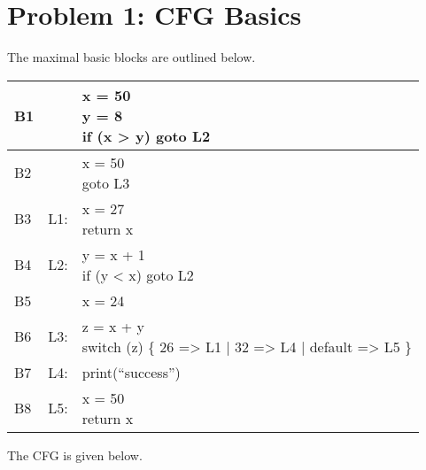 \section*{Problem 1: CFG Basics}

The maximal basic blocks are outlined below. 

\begin{table}[!ht]
\centering
\begin{tabular}{| l | l l |}
\hline
B1 & & \shortstack[l]{x = 50 \\ y = 8 \\ if (x > y) goto L2} \\
\hline
B2 & & \shortstack[l]{x = 50 \\ goto L3} \\
\hline
B3 & L1: & \shortstack[l]{x = 27 \\ return x}\\
\hline
B4 & L2: & \shortstack[l]{y = x + 1 \\ if (y < x) goto L2}\\
\hline
B5 &  & x = 24\\
\hline
B6 & L3: & \shortstack[l]{z = x + y \\ switch (z) \{ 26 => L1 | 32 => L4 | default => L5 \} } \\
\hline
B7 & L4: & print(``success'') \\
\hline
B8 & L5: & \shortstack[l]{x = 50\\return x}\\
\hline
\end{tabular}
\end{table}

The CFG is given below.

